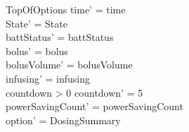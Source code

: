 \begin{schema}{TopOfOptions}
	time' = time\\ State' = State\\
	battStatus' = battStatus\\
	bolus' = bolus\\
	bolusVolume' = bolusVolume\\
	infusing' = infusing\\
	countdown > 0 \land countdown' = 5\\
	powerSavingCount' = powerSavingCount\\ 
	option' = DosingSummary\\
\end{schema}

